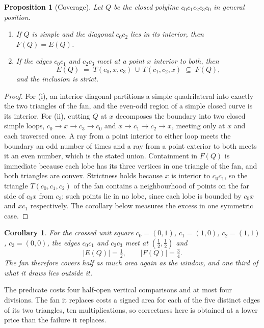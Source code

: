 \documentclass{article}
\newtheorem{proposition}{Proposition}
\newtheorem{corollary}{Corollary}
\theoremstyle{definition}
\begin{document}
\begin{proposition}[Coverage]
\label{prop:coverage}
Let $Q$ be the closed polyline $c_0c_1c_2c_3c_0$ in general position.
\begin{enumerate}
  \item If $Q$ is simple and the diagonal $c_0c_2$ lies in its interior, then
        $F(Q) = E(Q)$.
  \item If the edges $c_0c_1$ and $c_2c_3$ meet at a point $x$ interior to both,
        then
        \[
          E(Q) \;=\; T(c_0,x,c_3)\,\cup\,T(c_1,c_2,x) \;\subseteq\; F(Q),
        \]
        and the inclusion is strict.
\end{enumerate}
\end{proposition}

\begin{proof}
For (i), an interior diagonal partitions a simple quadrilateral into exactly the
two triangles of the fan, and the even-odd region of a simple closed curve is its
interior. For (ii), cutting $Q$ at $x$ decomposes the boundary into two closed
simple loops, $c_0 \to x \to c_3 \to c_0$ and $x \to c_1 \to c_2 \to x$, meeting
only at $x$ and each traversed once. A ray from a point interior to either loop
meets the boundary an odd number of times and a ray from a point exterior to both
meets it an even number, which is the stated union. Containment in $F(Q)$ is
immediate because each lobe has its three vertices in one triangle of the fan,
and both triangles are convex. Strictness holds because $x$ is interior to
$c_0c_1$, so the triangle $T(c_0,c_1,c_2)$ of the fan contains a neighbourhood of
points on the far side of $c_0x$ from $c_3$; such points lie in no lobe, since
each lobe is bounded by $c_0x$ and $xc_1$ respectively. The corollary below
measures the excess in one symmetric case.
\end{proof}

\begin{corollary}
\label{cor:coverage}
For the crossed unit square $c_0=(0,1)$, $c_1=(1,0)$, $c_2=(1,1)$, $c_3=(0,0)$,
the edges $c_0c_1$ and $c_2c_3$ meet at $(\tfrac12,\tfrac12)$ and
\[
  |E(Q)| = \tfrac12, \qquad |F(Q)| = \tfrac34 .
\]
The fan therefore covers half as much area again as the window, and one third of
what it draws lies outside it.
\end{corollary}

The predicate costs four half-open vertical comparisons and at most four
divisions. The fan it replaces costs a signed area for each of the five distinct
edges of its two triangles, ten multiplications, so correctness here is obtained
at a lower price than the failure it replaces.
\end{document}
